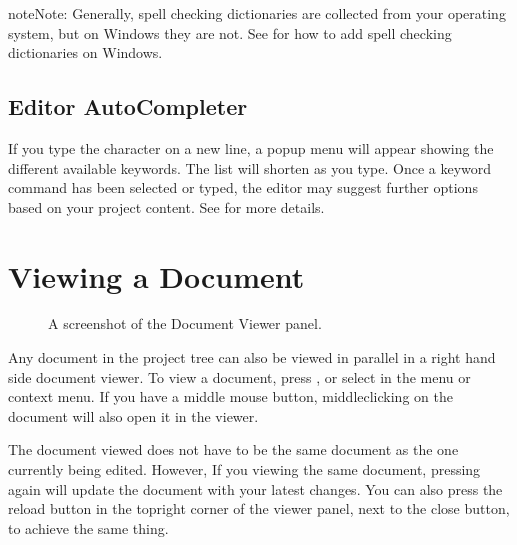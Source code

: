 \documentclass[a4paper,11pt,english]{sphinxmanual}
\begin{document}
\begin{sphinxadmonition}{note}{Note:}
\sphinxAtStartPar
Generally, spell checking dictionaries are collected from your operating system, but on Windows
they are not. See {\hyperref[\detokenize{more_customise:a-custom-dict}]{}} for how to add spell checking dictionaries on Windows.
\end{sphinxadmonition}


\subsection{Editor Auto\sphinxhyphen{}Completer}
\label{\detokenize{usage_writing:editor-auto-completer}}
\sphinxAtStartPar
If you type the character  on a new line, a pop\sphinxhyphen{}up menu will appear showing the different
available keywords. The list will shorten as you type. Once a keyword command has been selected or
typed, the editor may suggest further options based on your project content. See
{\hyperref[\detokenize{project_references:a-references-completer}]{}} for more details.

\sphinxAtStartPar
{}


\section{Viewing a Document}
\label{\detokenize{usage_writing:viewing-a-document}}\label{\detokenize{usage_writing:a-ui-view}}
\begin{figure}[htbp]
\centering
\capstart

\noindent{}
\caption{A screenshot of the Document Viewer panel.}\label{\detokenize{usage_writing:id2}}\end{figure}

\sphinxAtStartPar
Any document in the project tree can also be viewed in parallel in a right hand side document
viewer. To view a document, press , or select  in the menu or context
menu. If you have a middle mouse button, middle\sphinxhyphen{}clicking on the document will also open it in the
viewer.

\sphinxAtStartPar
The document viewed does not have to be the same document as the one currently being edited.
However, If you  viewing the same document, pressing  again will update the
document with your latest changes. You can also press the reload button in the top\textendash{}right corner of
the viewer panel, next to the close button, to achieve the same thing.
\end{document}
